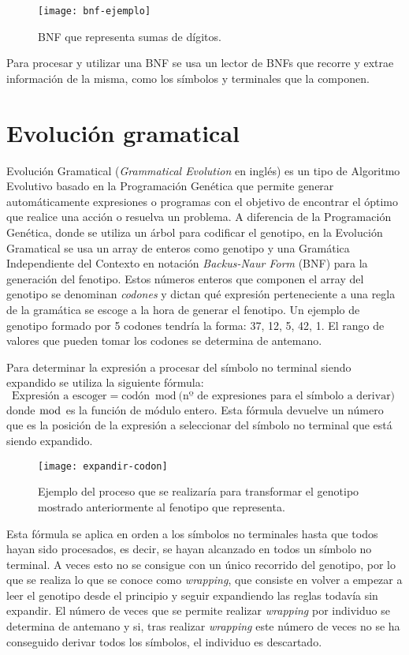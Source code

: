 \begin{figure}[H]
\centering
\texttt{[image: bnf-ejemplo]}
\caption{BNF que representa sumas de dígitos.}
\end{figure}

Para procesar y utilizar una BNF se usa un lector de BNFs que recorre y extrae información de la misma, como los símbolos y terminales que la componen.

\section{Evolución gramatical}
Evolución Gramatical (\textit{Grammatical Evolution} en inglés) es un tipo de Algoritmo Evolutivo basado en la Programación Genética que permite generar automáticamente expresiones o programas  con el objetivo de encontrar el óptimo que realice una acción o resuelva un problema. A diferencia de la Programación Genética, donde se utiliza un árbol para codificar el genotipo, en la Evolución Gramatical se usa un array de enteros como genotipo y una Gramática Independiente del Contexto en notación \textit{Backus-Naur Form} (BNF) para la generación del fenotipo. Estos números enteros que componen el array del genotipo se denominan \textit{codones} y dictan qué expresión perteneciente a una regla de la gramática se escoge a la hora de generar el fenotipo. Un ejemplo de genotipo formado por 5 codones tendría la forma: 37, 12, 5, 42, 1. El rango de valores que pueden tomar los codones se determina de antemano.

Para determinar la expresión a procesar del símbolo no terminal siendo expandido se utiliza la siguiente fórmula:
\begin{equation}
\textrm{Expresión a escoger} = \textrm{codón} \bmod \textrm{(nº de expresiones para el símbolo a derivar)}
\end{equation}
donde $\bmod$ es la función de módulo entero. Esta fórmula devuelve un número que es la posición de la expresión a seleccionar del símbolo no terminal que está siendo expandido\cite{o2012grammatical}.

\begin{figure}[H]
\centering
\texttt{[image: expandir-codon]}
\caption{Ejemplo del proceso que se realizaría para transformar el genotipo mostrado anteriormente al fenotipo que representa.}
\end{figure}

Esta fórmula se aplica en orden a los símbolos no terminales hasta que todos hayan sido procesados, es decir, se hayan alcanzado en todos un símbolo no terminal. A veces esto no se consigue con un único recorrido del genotipo, por lo que se realiza lo que se conoce como \textit{wrapping}, que consiste en  volver a empezar a leer el genotipo desde el principio y seguir expandiendo las reglas todavía sin expandir. El número de veces que se permite realizar \textit{wrapping} por individuo se determina de antemano y si, tras realizar \textit{wrapping} este número de veces no se ha conseguido derivar todos los símbolos, el individuo es descartado.

